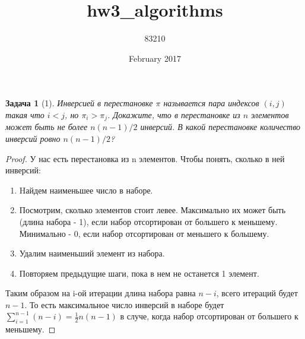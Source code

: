 \documentclass[12pt]{extarticle}
\title{hw3_algorithms}
\author{83210 }
\date{February 2017}
\newtheorem*{problem}{Задача}
\begin{document}
\begin{problem}[1]
{\em Инверсией} в перестановке $\pi$ называется пара индексов $(i,j)$ такая что $i<j$, но $\pi_i>\pi_j$. Докажите, что в перестановке из $n$ элементов может быть не более $n(n-1)/2$ инверсий. В какой перестановке количество инверсий ровно $n(n-1)/2$?
\end{problem}

\begin{proof}

 У нас есть перестановка из n элементов. Чтобы понять, сколько в ней инверсий: \begin{enumerate}
    \item Hайдем наименьшее число в наборе.
    \item Посмотрим, сколько элементов стоит левее. Максимально их может быть (длина набора - 1), если набор отсортирован от большего к меньшему. Минимально - 0, если набор отсортирован от меньшего к большему.
    \item Удалим наименьший элемент из набора. 
    \item Повторяем предыдущие шаги, пока в нем не останется 1 элемент.
\end{enumerate}
    
Таким образом на i-ой итерации длина набора равна $n-i$, всего итераций будет $n-1$. То есть максимальное число инверсий в наборе будет $\sum_{i=1}^{n-1} (n-i) = \frac{1}{2}n(n-1)$ в случе, когда набор отсортирован от большего к меньшему.

\end{proof}
\end{document}
